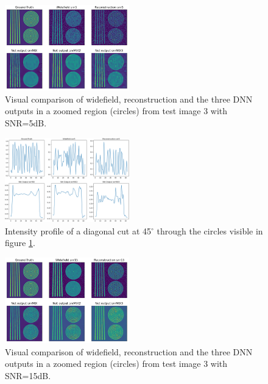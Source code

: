 \documentclass[conference]{IEEEtran}
\begin{document}
\begin{figure}[h!]
    \centering
    \includegraphics[width=0.48\textwidth]{images/test_img_3_model_comp_snr5_circle.png}
    \caption{Visual comparison of widefield, reconstruction and the three DNN outputs in a zoomed region (circles) from test image 3 with SNR=5dB.}
    \label{fig:test_img_3_model_comp_snr5_circle}
\end{figure}
\begin{figure}[h!]
    \centering
    \includegraphics[width=0.48\textwidth]{images/test_img_3_model_comp_snr5_circle_cut.png}
    \caption{Intensity profile of a diagonal cut at 45$^\circ$ through the circles visible in figure \ref{fig:test_img_3_model_comp_snr5_circle}.}
    \label{fig:test_img_3_model_comp_snr5_circle_cut}
\end{figure}
\begin{figure}[h!]
    \centering
    \includegraphics[width=0.48\textwidth]{images/test_img_3_model_comp_snr15_circle.png}
    \caption{Visual comparison of widefield, reconstruction and the three DNN outputs in a zoomed region (circles) from test image 3 with SNR=15dB.}
    \label{fig:test_img_3_model_comp_snr15_circle}
\end{figure}
\end{document}
